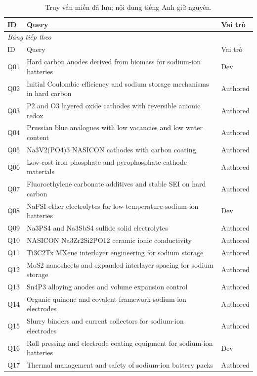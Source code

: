 \begingroup\small\setlength{\tabcolsep}{4pt}\renewcommand{\arraystretch}{1.16}
\begin{longtable}{lp{.67\linewidth}l}
\caption{Truy vấn miền đã lưu; nội dung tiếng Anh giữ nguyên.}\label{tab:queries}\\
\toprule ID & Query & Vai trò \\
\midrule\endfirsthead
\multicolumn{3}{l}{\textit{Bảng tiếp theo}}\\
\toprule ID & Query & Vai trò \\
\midrule\endhead
\bottomrule\endfoot
Q01 & Hard carbon anodes derived from biomass for sodium-ion batteries & Dev \\
Q02 & Initial Coulombic efficiency and sodium storage mechanisms in hard carbon & Authored \\
Q03 & P2 and O3 layered oxide cathodes with reversible anionic redox & Authored \\
Q04 & Prussian blue analogues with low vacancies and low water content & Authored \\
Q05 & Na3V2(PO4)3 NASICON cathodes with carbon coating & Authored \\
Q06 & Low-cost iron phosphate and pyrophosphate cathode materials & Authored \\
Q07 & Fluoroethylene carbonate additives and stable SEI on hard carbon & Authored \\
Q08 & NaFSI ether electrolytes for low-temperature sodium-ion batteries & Dev \\
Q09 & Na3PS4 and Na3SbS4 sulfide solid electrolytes & Authored \\
Q10 & NASICON Na3Zr2Si2PO12 ceramic ionic conductivity & Authored \\
Q11 & Ti3C2Tx MXene interlayer engineering for sodium storage & Authored \\
Q12 & MoS2 nanosheets and expanded interlayer spacing for sodium storage & Authored \\
Q13 & Sn4P3 alloying anodes and volume expansion control & Authored \\
Q14 & Organic quinone and covalent framework sodium-ion electrodes & Authored \\
Q15 & Slurry binders and current collectors for sodium-ion electrodes & Authored \\
Q16 & Roll pressing and electrode coating equipment for sodium-ion batteries & Dev \\
Q17 & Thermal management and safety of sodium-ion battery packs & Authored \\

\end{longtable}

